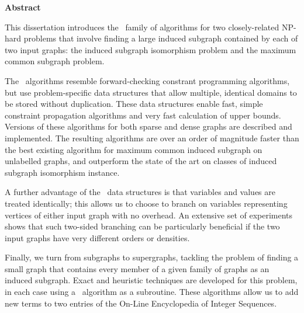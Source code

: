 \vspace*{1.75in}
\begin{center} {\bf Abstract}\end{center}

This dissertation introduces the \McSplit\ family of algorithms for
two closely-related NP-hard problems that involve finding a large
induced subgraph contained by each of two input graphs: the induced subgraph
isomorphism problem and the maximum common subgraph problem.

The \McSplit\ algorithms resemble forward-checking constrant programming
algorithms, but use problem-specific data structures that allow
multiple, identical domains to be stored without duplication.  These data structures
enable fast, simple constraint propagation algorithms and very fast calculation of
upper bounds.  Versions of these algorithms for both sparse and dense graphs are
described and implemented.
The resulting algorithms are over an order of magnitude faster
than the best existing algorithm for maximum common induced subgraph on unlabelled
graphs, and outperform the state of the art on classes of induced subgraph
isomorphism instance.

A further advantage of the \McSplit\ data structures is that variables and
values are treated identically; this allows us to choose to branch on variables
representing vertices of either input graph with no overhead.  An extensive
set of experiments shows that such two-sided branching can be particularly
beneficial if the two input graphs have very different orders or densities.

Finally, we turn from subgraphs to supergraphs, tackling the problem of
finding a small graph that contains every member of a given family of graphs
as an induced subgraph.  Exact and heuristic techniques are developed for
this problem, in each case using a \McSplit\ algorithm as a subroutine.
These algorithms allow us to add new terms to two entries of the
On-Line Encyclopedia of Integer Sequences.
